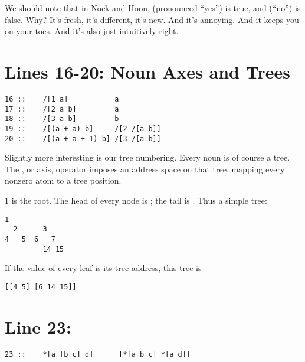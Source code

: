 We should note that in Nock and Hoon,  (pronounced ``yes'') is true, and 
(``no'') is false.  Why?  It's fresh, it's different, it's new.  And it's
annoying.  And it keeps you on your toes.  And it's also just intuitively
right.

\section{Lines 16-20: Noun Axes and Trees}

\begin{framed_shaded}
\begin{Verbatim}[fontsize=\relsize{-2.5},fontseries=b,commandchars=\\\{\}]
16 ::    /[1 a]           a
17 ::    /[2 a b]         a
18 ::    /[3 a b]         b
19 ::    /[(a + a) b]     /[2 /[a b]]
20 ::    /[(a + a + 1) b] /[3 /[a b]]
\end{Verbatim}
\end{framed_shaded}
Slightly more interesting is our tree numbering.  Every noun is of course a
tree.  The \kode{/}, or axis, operator imposes an address space on that tree,
mapping every nonzero atom to a tree position.

1 is the root.  The head of every node  is ; the tail is .  Thus a
simple tree:

\begin{framed_shaded}
\begin{Verbatim}[fontsize=\relsize{-2.5},fontseries=b,commandchars=\\\{\}]
     1
  2      3
4   5  6   7
         14 15
\end{Verbatim}
\end{framed_shaded}
If the value of every leaf is its tree address, this tree is

\begin{framed_shaded}
\begin{Verbatim}[fontsize=\relsize{-2.5},fontseries=b,commandchars=\\\{\}]
  [[4 5] [6 14 15]]
\end{Verbatim}
\end{framed_shaded}

\section{Line 23:}

\begin{framed_shaded}
\begin{Verbatim}[fontsize=\relsize{-2.5},fontseries=b,commandchars=\\\{\}]
23 ::    *[a [b c] d]      [*[a b c] *[a d]]
\end{Verbatim}
\end{framed_shaded}

